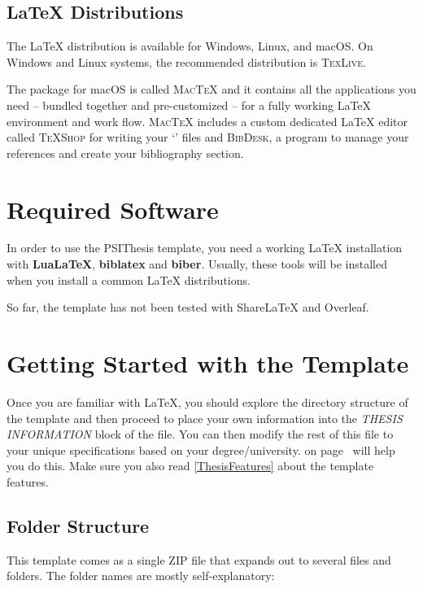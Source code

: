 \subsection{LaTeX Distributions}

The LaTeX distribution is available for Windows, Linux, and macOS\@.
On Windows and Linux systems, the recommended distribution is \textsc{TexLive}.

The package for macOS is called \textsc{MacTeX} and it contains all the applications you need -- bundled together and pre-customized -- for a fully working LaTeX environment and work flow. \textsc{MacTeX} includes a custom dedicated LaTeX editor called \textsc{TeXShop} for writing your `' files and \textsc{BibDesk}, a program to manage your references and create your bibliography section.



\section{Required Software}

In order to use the PSIThesis template, you need a working LaTeX installation with \textbf{LuaLaTeX}, \textbf{biblatex} and \textbf{biber}. Usually, these tools will be installed when you install a common LaTeX distributions.

So far, the template has not been tested with ShareLaTeX and Overleaf.


\section{Getting Started with the Template}

Once you are familiar with LaTeX, you should explore the directory structure of the template and then proceed to place your own information into the \emph{THESIS INFORMATION} block of the  file. You can then modify the rest of this file to your unique specifications based on your degree/university.  on page~\pageref{FillingFile} will help you do this. Make sure you also read \cref{ThesisFeatures} about the template features.


\subsection{Folder Structure}

This template comes as a single ZIP file that expands out to several files and folders. The folder names are mostly self-explanatory:

